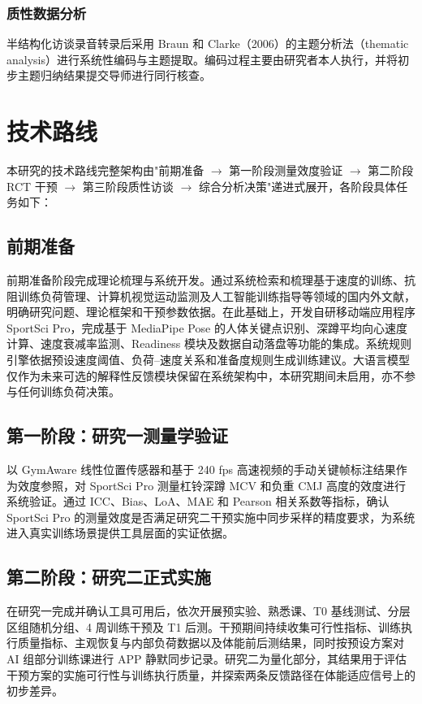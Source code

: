 \documentclass[UTF8,zihao=-4,twoside,openany]{ctexbook}
\begin{document}
\subsubsection{质性数据分析}
半结构化访谈录音转录后采用 Braun 和 Clarke（2006）的主题分析法（thematic analysis）进行系统性编码与主题提取。编码过程主要由研究者本人执行，并将初步主题归纳结果提交导师进行同行核查。

\section{技术路线}
本研究的技术路线完整架构由"前期准备 $\rightarrow$ 第一阶段测量效度验证 $\rightarrow$ 第二阶段 RCT 干预 $\rightarrow$ 第三阶段质性访谈 $\rightarrow$ 综合分析决策"递进式展开，各阶段具体任务如下：

\subsection{前期准备}
前期准备阶段完成理论梳理与系统开发。通过系统检索和梳理基于速度的训练、抗阻训练负荷管理、计算机视觉运动监测及人工智能训练指导等领域的国内外文献，明确研究问题、理论框架和干预参数依据。在此基础上，开发自研移动端应用程序 SportSci Pro，完成基于 MediaPipe Pose 的人体关键点识别、深蹲平均向心速度计算、速度衰减率监测、Readiness 模块及数据自动落盘等功能的集成。系统规则引擎依据预设速度阈值、负荷--速度关系和准备度规则生成训练建议。大语言模型仅作为未来可选的解释性反馈模块保留在系统架构中，本研究期间未启用，亦不参与任何训练负荷决策。

\subsection{第一阶段：研究一测量学验证}
以 GymAware 线性位置传感器和基于 240 fps 高速视频的手动关键帧标注结果作为效度参照，对 SportSci Pro 测量杠铃深蹲 MCV 和负重 CMJ 高度的效度进行系统验证。通过 ICC、Bias、LoA、MAE 和 Pearson 相关系数等指标，确认 SportSci Pro 的测量效度是否满足研究二干预实施中同步采样的精度要求，为系统进入真实训练场景提供工具层面的实证依据。

\subsection{第二阶段：研究二正式实施}
在研究一完成并确认工具可用后，依次开展预实验、熟悉课、T0 基线测试、分层区组随机分组、4 周训练干预及 T1 后测。干预期间持续收集可行性指标、训练执行质量指标、主观恢复与内部负荷数据以及体能前后测结果，同时按预设方案对 AI 组部分训练课进行 APP 静默同步记录。研究二为量化部分，其结果用于评估干预方案的实施可行性与训练执行质量，并探索两条反馈路径在体能适应信号上的初步差异。
\end{document}
